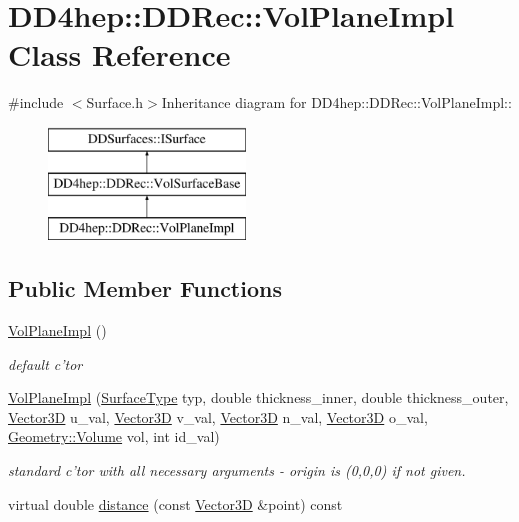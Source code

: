 \hypertarget{class_d_d4hep_1_1_d_d_rec_1_1_vol_plane_impl}{
\section{DD4hep::DDRec::VolPlaneImpl Class Reference}
\label{class_d_d4hep_1_1_d_d_rec_1_1_vol_plane_impl}
}


{\ttfamily \#include $<$Surface.h$>$}Inheritance diagram for DD4hep::DDRec::VolPlaneImpl::\begin{figure}[H]
\begin{center}
\leavevmode
\includegraphics[height=3cm]{class_d_d4hep_1_1_d_d_rec_1_1_vol_plane_impl}
\end{center}
\end{figure}
\subsection*{Public Member Functions}
\begin{DoxyCompactItemize}
\item 
\hyperlink{class_d_d4hep_1_1_d_d_rec_1_1_vol_plane_impl_a37e60d5d920d384a03463e2870293306}{VolPlaneImpl} ()
\begin{DoxyCompactList}\small\item\em default c'tor \item\end{DoxyCompactList}\item 
\hyperlink{class_d_d4hep_1_1_d_d_rec_1_1_vol_plane_impl_adf4bdd2cb9f2f01e7662f6b0a1cb1379}{VolPlaneImpl} (\hyperlink{class_d_d_surfaces_1_1_surface_type}{SurfaceType} typ, double thickness\_\-inner, double thickness\_\-outer, \hyperlink{class_d_d_surfaces_1_1_vector3_d}{Vector3D} u\_\-val, \hyperlink{class_d_d_surfaces_1_1_vector3_d}{Vector3D} v\_\-val, \hyperlink{class_d_d_surfaces_1_1_vector3_d}{Vector3D} n\_\-val, \hyperlink{class_d_d_surfaces_1_1_vector3_d}{Vector3D} o\_\-val, \hyperlink{class_d_d4hep_1_1_geometry_1_1_volume}{Geometry::Volume} vol, int id\_\-val)
\begin{DoxyCompactList}\small\item\em standard c'tor with all necessary arguments -\/ origin is (0,0,0) if not given. \item\end{DoxyCompactList}\item 
virtual double \hyperlink{class_d_d4hep_1_1_d_d_rec_1_1_vol_plane_impl_ad75ba6e93463cf8ce312d312111c8391}{distance} (const \hyperlink{class_d_d_surfaces_1_1_vector3_d}{Vector3D} \&point) const 
\end{DoxyCompactItemize}


